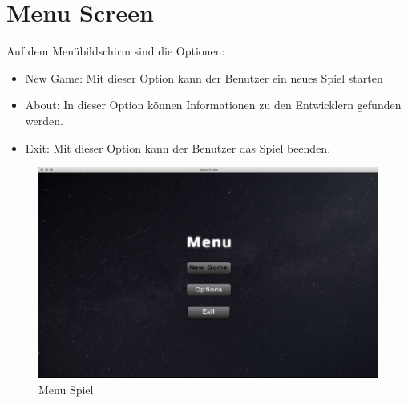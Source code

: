 \documentclass[11pt]{article}
\begin{document}
\section{Menu Screen}
Auf dem Menübildschirm sind die Optionen:
\begin{itemize}
\item New Game: Mit dieser Option kann der Benutzer ein neues Spiel starten
\item About: In dieser Option können Informationen zu den Entwicklern gefunden werden.
\item Exit: Mit dieser Option kann der Benutzer das Spiel beenden.
\end{itemize}
\begin{figure}[htp]
\centering
\includegraphics[scale=0.3]{TestProtocolBilder/menuScreen.png}
\caption{Menu Spiel}
\end{figure}
\newpage
\end{document}
